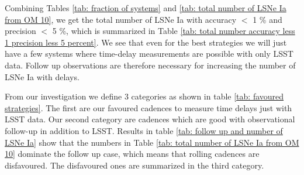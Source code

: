 %
Combining Tables \ref{tab: fraction of systems} and \ref{tab: total
  number of LSNe Ia from OM 10}, we get the total number of LSNe Ia
with accuracy $<$ 1 \% and precision $<$ 5 \%, which is summarized in
Table \ref{tab: total number accuracy less 1 precision less 5
  percent}. We see that even for the best strategies we will just have
a few systems where time-delay measurements are possible with only
LSST data. Follow up observations are therefore necessary for
increasing the number of LSNe Ia with delays.

From our investigation we define 3 categories as shown in table \ref{tab: favoured strategies}. The first are our
favoured cadences to measure time delays just with LSST data. Our
second category are cadences which are good with
observational follow-up in addition to LSST. Results in table \ref{tab: follow up and number of LSNe Ia} show that the
numbers in Table \ref{tab: total number of LSNe Ia from OM 10}
dominate the follow up case, which means that rolling cadences are
disfavoured. The disfavoured ones are summarized in the third category.

